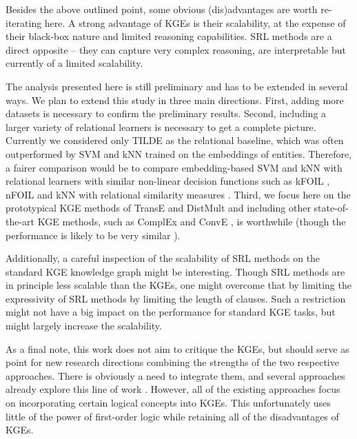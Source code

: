 Besides the above outlined point, some obvious (dis)advantages are worth re-iterating here.
A strong advantage of KGEs is their scalability, at the expense of their black-box nature and limited reasoning capabilities.
SRL methods are a direct opposite -- they can capture very complex reasoning, are interpretable but currently of a limited scalability.



The analysis presented here is still preliminary and has to be extended in several ways.
We plan to extend this study in three main directions.
First, adding more datasets is necessary to confirm the preliminary results.
Second, including a larger variety of relational learners is necessary to get a complete picture.
Currently we considered only TILDE as the relational baseline, which was often outperformed by SVM and kNN trained on the embeddings of entities.
Therefore, a fairer comparison would be to compare embedding-based SVM and kNN with relational learners with similar non-linear decision functions such as kFOIL \cite{Landwehr:2006:KLS:1597538.1597601}, nFOIL \cite{Landwehr:2005:NIN:1619410.1619460} and kNN with relational similarity measures \cite{DumancicMLJ2017,Shervashidze:2011:WGK:1953048.2078187}.
Third, we focus here on the prototypical KGE methods of TransE and DistMult and including other state-of-the-art KGE methods, such as ComplEx \cite{trouillon2016complex} and ConvE \cite{dettmers2018conve}, is worthwhile (though the performance is likely to be very similar \cite{DBLP:conf/rep4nlp/KadlecBK17}).


Additionally, a careful inspection of the scalability of SRL methods on the standard KGE knowledge graph might be interesting.
Though SRL methods are in principle less scalable than the KGEs, one might overcome that by limiting the expressivity of SRL methods by limiting the length of clauses.
Such a restriction might not have a big impact on the performance for standard KGE tasks, but might largely increase the scalability.


As a final note, this work does not aim to critique the KGEs, but should serve as point for new research directions combining the strengths of the two respective approaches.
There is obviously a need to integrate them, and several approaches already explore this line of work \cite{DBLP:conf/uai/MinerviniDRR17,demeester2016lifted,Schlichtkrull2017ModelingRD}.
However, all of the existing approaches focus on incorporating certain logical concepts into KGEs.
This unfortunately uses little of the power of first-order logic while retaining all of the disadvantages of KGEs.









